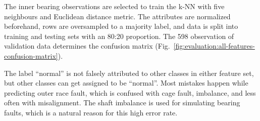 The inner bearing observations are selected to train the k-NN with five neighbours and Euclidean distance metric. The attributes are normalized beforehand, rows are oversampled to a majority label, and data is split into training and testing sets with an 80:20 proportion. The 598 observation of validation data determines the confusion matrix (Fig.~\ref{fig:evaluation:all-features-confusion-matrix}). 

The label ``normal'' is not falsely attributed to other classes in either feature set, but other classes can get assigned to be ``normal''. Most mistakes happen while predicting outer race fault, which is confused with cage fault, imbalance, and less often with misalignment. The shaft imbalance is used for simulating bearing faults, which is a natural reason for this high error rate.

